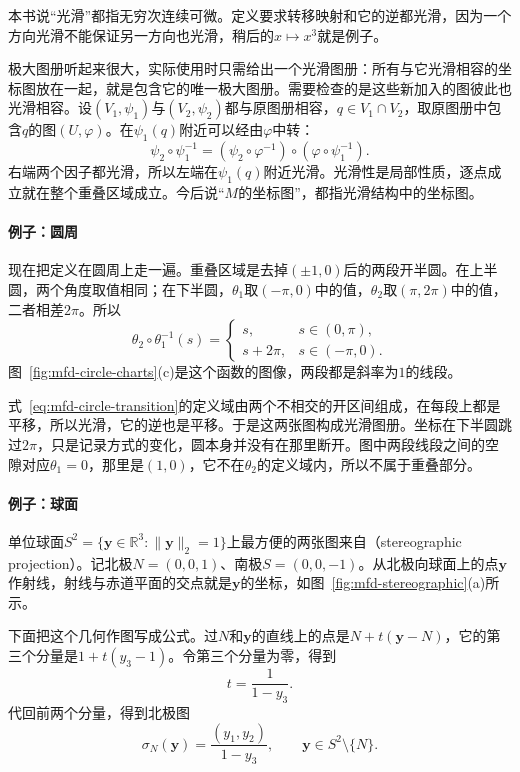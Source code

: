 本书说“光滑”都指无穷次连续可微。定义要求转移映射和它的逆都光滑，因为一个方向光滑不能保证另一方向也光滑，稍后的$x\mapsto x^3$就是例子。

极大图册听起来很大，实际使用时只需给出一个光滑图册：所有与它光滑相容的坐标图放在一起，就是包含它的唯一极大图册。需要检查的是这些新加入的图彼此也光滑相容。设$(V_1,\psi_1)$与$(V_2,\psi_2)$都与原图册相容，$q\in V_1\cap V_2$，取原图册中包含$q$的图$(U,\varphi)$。在$\psi_1(q)$附近可以经由$\varphi$中转：
\[
\psi_2\circ\psi_1^{-1}=(\psi_2\circ\varphi^{-1})\circ(\varphi\circ\psi_1^{-1}).
\]
右端两个因子都光滑，所以左端在$\psi_1(q)$附近光滑。光滑性是局部性质，逐点成立就在整个重叠区域成立。今后说“$M$的坐标图”，都指光滑结构中的坐标图。

\paragraph{例子：圆周}
现在把定义在圆周上走一遍。重叠区域是去掉$(\pm1,0)$后的两段开半圆。在上半圆，两个角度取值相同；在下半圆，$\theta_1$取$(-\pi,0)$中的值，$\theta_2$取$(\pi,2\pi)$中的值，二者相差$2\pi$。所以
\begin{equation}
\theta_2\circ\theta_1^{-1}(s)=
\begin{cases}
s, & s\in(0,\pi),\\
s+2\pi, & s\in(-\pi,0).
\end{cases}
\label{eq:mfd-circle-transition}
\end{equation}
图~\ref{fig:mfd-circle-charts}(c)是这个函数的图像，两段都是斜率为$1$的线段。

式~\eqref{eq:mfd-circle-transition}的定义域由两个不相交的开区间组成，在每段上都是平移，所以光滑，它的逆也是平移。于是这两张图构成光滑图册。坐标在下半圆跳过$2\pi$，只是记录方式的变化，圆本身并没有在那里断开。图中两段线段之间的空隙对应$\theta_1=0$，那里是$(1,0)$，它不在$\theta_2$的定义域内，所以不属于重叠部分。

\paragraph{例子：球面}
单位球面$S^2=\{\bm y\in\mathbb R^3:\lVert\bm y\rVert_2=1\}$上最方便的两张图来自（stereographic projection）。记北极$N=(0,0,1)$、南极$S=(0,0,-1)$。从北极向球面上的点$\bm y$作射线，射线与赤道平面的交点就是$\bm y$的坐标，如图~\ref{fig:mfd-stereographic}(a)所示。

下面把这个几何作图写成公式。过$N$和$\bm y$的直线上的点是$N+t(\bm y-N)$，它的第三个分量是$1+t(y_3-1)$。令第三个分量为零，得到
\[
t=\frac{1}{1-y_3}.
\]
代回前两个分量，得到北极图
\begin{equation}
\sigma_N(\bm y)=\frac{(y_1,y_2)}{1-y_3},\qquad \bm y\in S^2\setminus\{N\}.
\label{eq:mfd-stereographic-north}
\end{equation}

